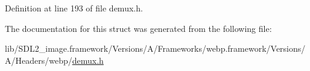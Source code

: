 Definition at line 193 of file demux.\+h.



The documentation for this struct was generated from the following file\+:\begin{DoxyCompactItemize}
\item 
lib/\+S\+D\+L2\+\_\+image.\+framework/\+Versions/\+A/\+Frameworks/webp.\+framework/\+Versions/\+A/\+Headers/webp/\mbox{\hyperlink{demux_8h}{demux.\+h}}\end{DoxyCompactItemize}
